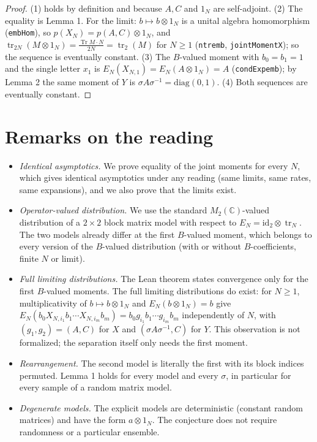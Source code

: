 \documentclass[11pt]{article}
\theoremstyle{definition}
\theoremstyle{remark}
\renewcommand{\_}{\oldus\allowbreak}
\newcommand{\tr}{\operatorname{tr}}
\newcommand{\Tr}{\operatorname{Tr}}
\newcommand{\C}{\mathbb{C}}
\begin{document}
\begin{proof}
(1) holds by definition and because $A,C$ and $1_N$ are self-adjoint. (2) The equality is
Lemma 1. For the limit: $b\mapsto b\otimes 1_N$ is a unital algebra homomorphism
(\texttt{embHom}), so $p(X_N)=p(A,C)\otimes 1_N$, and
$\tr_{2N}(M\otimes 1_N)=\frac{\Tr M\cdot N}{2N}=\tr_2(M)$ for $N\ge1$ (\texttt{ntr\_emb},
\texttt{jointMoment\_X}); so the sequence is eventually constant. (3) The $B$-valued moment with
$b_0=b_1=1$ and the single letter $x_1$ is $E_N(X_{N,1})=E_N(A\otimes 1_N)=A$
(\texttt{condExp\_emb}); by Lemma 2 the same moment of $Y$ is $\sigma A\sigma^{-1}=\mathrm{diag}(0,1)$.
(4) Both sequences are eventually constant.
\end{proof}

\section{Remarks on the reading}

\begin{itemize}
\item \emph{Identical asymptotics.} We prove equality of the joint moments for every $N$, which
gives identical asymptotics under any reading (same limits, same rates, same expansions), and we
also prove that the limits exist.
\item \emph{Operator-valued distribution.} We use the standard $M_2(\C)$-valued distribution of a
$2\times2$ block matrix model with respect to $E_N=\mathrm{id}_2\otimes\tr_N$. The two models
already differ at the first $B$-valued moment, which belongs to every version of the $B$-valued
distribution (with or without $B$-coefficients, finite $N$ or limit).
\item \emph{Full limiting distributions.} The Lean theorem states convergence only for the first
$B$-valued moments. The full limiting distributions do exist: for $N\ge1$, multiplicativity of
$b\mapsto b\otimes1_N$ and $E_N(b\otimes1_N)=b$ give
$E_N(b_0X_{N,i_1}b_1\cdots X_{N,i_m}b_m)=b_0g_{i_1}b_1\cdots g_{i_m}b_m$ independently of $N$, with
$(g_1,g_2)=(A,C)$ for $X$ and $(\sigma A\sigma^{-1},C)$ for $Y$. This observation is not formalized;
the separation itself only needs the first moment.
\item \emph{Rearrangement.} The second model is literally the first with its block indices
permuted. Lemma 1 holds for every model and every $\sigma$, in particular for every sample of a
random matrix model.
\item \emph{Degenerate models.} The explicit models are deterministic (constant random matrices)
and have the form $a\otimes 1_N$. The conjecture does not require randomness or a particular
ensemble.
\end{itemize}
\end{document}
